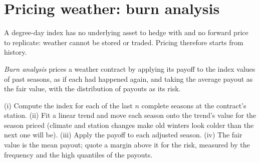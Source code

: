 \begin{omfigure}

\label{fig:m3:freight-weather-and-other-corners:hdd}
\end{omfigure}

\section{Pricing weather: burn analysis}

A degree-day index has no underlying asset to hedge with and no forward price to replicate: weather
cannot be stored or traded. Pricing therefore starts from history.

\begin{definition}\label{def:m3:freight-weather-and-other-corners:burn}
\emph{Burn analysis} prices a weather contract by applying its payoff to the index
values of past seasons, as if each had happened again, and taking the average payout as the fair value,
with the distribution of payouts as its risk.
\end{definition}

\begin{method}\label{met:m3:freight-weather-and-other-corners:burn}
(i) Compute the index for each of the last $n$ complete seasons at the contract's station.
(ii) Fit a linear trend and move each season onto the trend's value for the season priced (climate and
station changes make old winters look colder than the next one will be). (iii) Apply the payoff to each
adjusted season. (iv) The fair value is the mean payout; quote a margin above it for the risk, measured
by the frequency and the high quantiles of the payouts.
\end{method}

